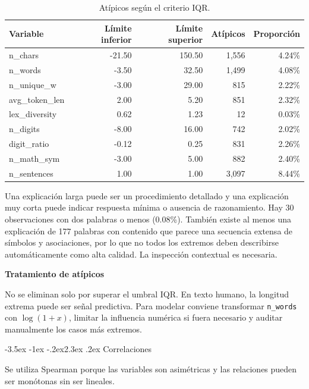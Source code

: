 \documentclass[11pt,oneside,openany]{book}
\makeatletter
\renewcommand\section{\@startsection{section}{1}{\z@}%
  {-3.5ex \@plus -1ex \@minus -.2ex}{2.3ex \@plus .2ex}%
  {\normalfont\Large\sffamily\bfseries\color{AzulMedio}}}
\newenvironment{decision}[1][]{%
  \begin{lrbox}{\infobox}\begin{minipage}{0.92\textwidth}
  \color{GrisTexto}\sffamily\textbf{#1}\par\smallskip\rmfamily}
  {\end{minipage}\end{lrbox}\par\medskip\noindent
   \colorbox{VerdeClaro}{\usebox{\infobox}}\par\medskip}
\newcommand{\codigo}[1]{\texttt{#1}}
\makeatother
\begin{document}
\begin{table}[htbp]
\centering
\small
\caption{Atípicos según el criterio IQR.}
\label{tab:outliers}
\begin{tabular}{@{}lrrrr@{}}
\toprule
\textbf{Variable} & \textbf{Límite inferior} & \textbf{Límite superior} &
\textbf{Atípicos} & \textbf{Proporción}\\
\midrule
n\_chars & -21.50 & 150.50 & 1,556 & 4.24\%\\
n\_words & -3.50 & 32.50 & 1,499 & 4.08\%\\
n\_unique\_w & -3.00 & 29.00 & 815 & 2.22\%\\
avg\_token\_len & 2.00 & 5.20 & 851 & 2.32\%\\
lex\_diversity & 0.62 & 1.23 & 12 & 0.03\%\\
n\_digits & -8.00 & 16.00 & 742 & 2.02\%\\
digit\_ratio & -0.12 & 0.25 & 831 & 2.26\%\\
n\_math\_sym & -3.00 & 5.00 & 882 & 2.40\%\\
n\_sentences & 1.00 & 1.00 & 3,097 & 8.44\%\\
\bottomrule
\end{tabular}
\end{table}

Una explicación larga puede ser un procedimiento detallado y una explicación
muy corta puede indicar respuesta mínima o ausencia de razonamiento. Hay 30
observaciones con dos palabras o menos (0.08\%). También existe al menos una
explicación de 177 palabras con contenido que parece una secuencia extensa de
símbolos y asociaciones, por lo que no todos los extremos deben describirse
automáticamente como alta calidad. La inspección contextual es necesaria.

\begin{decision}[Tratamiento de atípicos]
No se eliminan solo por superar el umbral IQR. En texto humano, la longitud
extrema puede ser señal predictiva. Para modelar conviene transformar
\codigo{n\_words} con \(\log(1+x)\), limitar la influencia numérica si fuera
necesario y auditar manualmente los casos más extremos.
\end{decision}

\section{Correlaciones}

Se utiliza Spearman porque las variables son asimétricas y las relaciones
pueden ser monótonas sin ser lineales.
\end{document}
